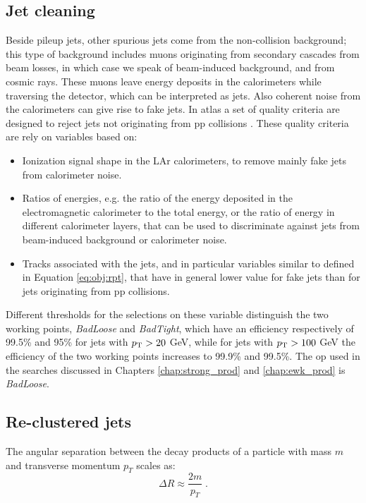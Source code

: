 \subsection{Jet cleaning}
\label{sec:jetcleaning}

Beside pileup jets, other spurious jets come from the non-collision background; this type of background includes muons originating from secondary cascades from beam losses, in which case we speak of beam-induced background, and from cosmic rays. These muons leave energy deposits in the calorimeters while traversing the detector, which can be interpreted as jets. Also coherent noise from the calorimeters can give rise to fake jets. In \gls{atlas} a set of quality criteria are designed to reject jets not originating from \gls{pp} collisions \cite{ATLAS-CONF-2015-029}. These quality criteria are rely on variables based on:
\begin{itemize}
\item Ionization signal shape in the LAr calorimeters, to remove mainly fake jets from calorimeter noise. 
\item Ratios of energies, e.g. the ratio of the energy deposited in the electromagnetic calorimeter to the total energy, or the ratio of energy in different calorimeter layers, that can be used to discriminate against jets from beam-induced background or calorimeter noise.
\item Tracks associated with the jets, and in particular variables similar to \RpT defined in Equation \ref{eq:obj:rpt}, that have in general lower value for fake jets than for jets originating from \gls{pp} collisions. 
\end{itemize} 

Different thresholds for the selections on these variable distinguish the two working points, \textit{BadLoose} and \textit{BadTight}, which have an efficiency respectively of 99.5\% and 95\% for jets with $p_{\rm T} > 20$ GeV, while for jets with $p_{\rm T} > 100$ GeV the efficiency of the two working points increases to 99.9\% and 99.5\%. The \gls{op} used in the searches discussed in Chapters \ref{chap:strong_prod} and \ref{chap:ewk_prod} is \textit{BadLoose}. 

\subsection{Re-clustered jets}
\label{sec:reclustering}

The angular separation between the decay products of a particle with mass $m$ and transverse momentum 
$p_T$ scales as:
\begin{equation}
\Delta R \approx \frac{2 m}{p_T} \; . \nonumber
\end{equation}

